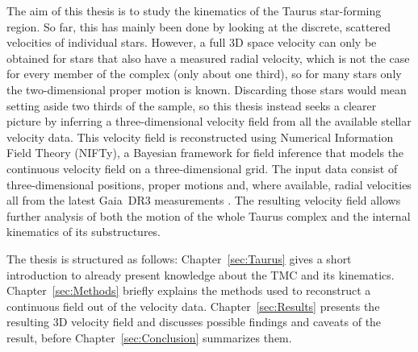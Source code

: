 The aim of this thesis is to study the kinematics of the Taurus star-forming region. So far,
this has mainly been done by looking at the discrete, scattered velocities of individual stars.
However, a full 3D space velocity can only be obtained for stars that also have a measured
radial velocity, which is not the case for every member of the complex (only about one third),
so for many stars only the two-dimensional proper motion is known. Discarding those stars would
mean setting aside two thirds of the sample, so this thesis instead seeks a clearer picture by inferring a three-dimensional
velocity field from all the available stellar velocity data. This velocity field is reconstructed using Numerical
Information Field Theory (NIFTy), a Bayesian framework for field inference that models
the continuous velocity field on a three-dimensional grid. The input data consist of three-dimensional
positions, proper motions and, where available, radial velocities all from the latest
Gaia~DR3 measurements \citep{GaiaCollaboration2023}. The resulting velocity field allows further analysis
of both the motion of the whole Taurus complex and the internal kinematics of its substructures.

The thesis is structured as follows: Chapter~\ref{sec:Taurus} gives a short introduction
to already present knowledge about the TMC and its kinematics. Chapter~\ref{sec:Methods}
briefly explains the methods used to reconstruct a continuous field out of the velocity
data. Chapter~\ref{sec:Results} presents the resulting 3D velocity field and discusses possible
findings and caveats of the result, before Chapter~\ref{sec:Conclusion} summarizes them.
